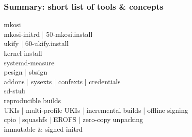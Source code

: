 \documentclass[]{beamer}
\newcommand\pp\pause
\begin{document}








\begin{frame}
  \frametitle{Summary: short list of tools \& concepts}

  \pp
  mkosi \\
  mkosi-initrd | 50-mkosi.install \\
  ukify | 60-ukify.install \\
  kernel-install \\
  systemd-measure \\
  pesign | sbsign \\
  addons | sysexts | confexts | credentials \\
  sd-stub \\
  reproducible builds \\
  UKIs | multi-profile UKIs | incremental builds | offline signing\\
  cpio | squashfs | EROFS | zero-copy unpacking \\
  immutable \& signed initrd

\end{frame}
\end{document}
